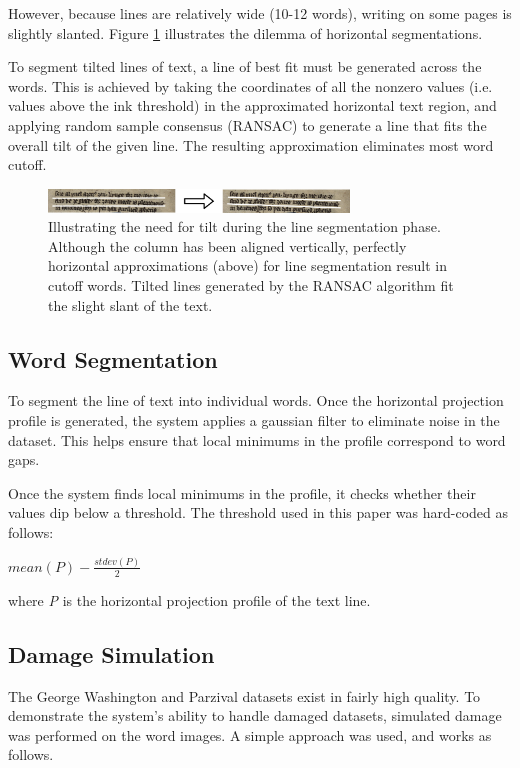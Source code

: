 \documentclass[final]{ukthesis}
\begin{document}
However, because lines are relatively wide (10-12 words), writing on some pages is slightly slanted. Figure \ref{fig:flat-vs-tilted} illustrates the dilemma of horizontal segmentations.

To segment tilted lines of text, a line of best fit must be generated across the words. This is achieved by taking the coordinates of all the nonzero values (i.e. values above the ink threshold) in the approximated horizontal text region, and applying random sample consensus (RANSAC) \cite{fischler1987random} to generate a line that fits the overall tilt of the given line. The resulting approximation eliminates most word cutoff.

\begin{figure}[t]
\begin{center}
\includegraphics[width=8cm]{flat-vs-tilted}
\end{center}
\caption{Illustrating the need for tilt during the line segmentation phase. Although the column has been aligned vertically, perfectly horizontal approximations (above) for line segmentation result in cutoff words. Tilted lines generated by the RANSAC algorithm fit the slight slant of the text.}
\label{fig:flat-vs-tilted}
\end{figure}


\subsection{Word Segmentation}
To segment the line of text into individual words. Once the horizontal projection profile is generated, the system applies a gaussian filter to eliminate noise in the dataset. This helps ensure that local minimums in the profile correspond to word gaps.

Once the system finds local minimums in the profile, it checks whether their values dip below a threshold. The threshold used in this paper was hard-coded as follows:

\begin{center}
\begin{math}
mean(P) - \frac{stdev(P)}{2}
\end{math}
\end{center}

where {\em P} is the horizontal projection profile of the text line.


\subsection{Damage Simulation}
The George Washington and Parzival datasets exist in fairly high quality. To demonstrate the system's ability to handle damaged datasets, simulated damage was performed on the word images. A simple approach was used, and works as follows.
\end{document}
